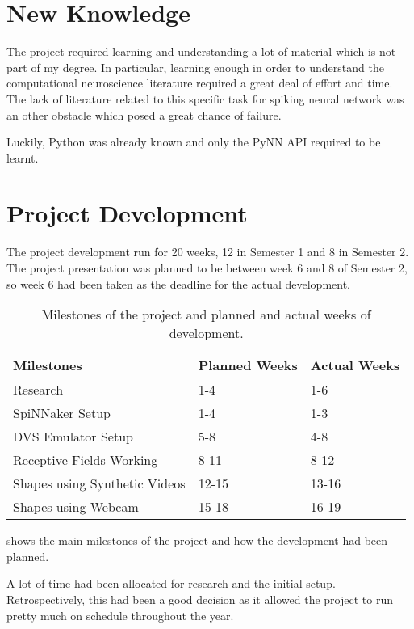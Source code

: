 \section{New Knowledge}
The project required learning and understanding a lot of material which is not part of my degree. In particular, learning enough in order to understand the computational neuroscience literature required a great deal of effort and time. The lack of literature related to this specific task for spiking neural network was an other obstacle which posed a great chance of failure. 

Luckily, Python was already known and only the PyNN API required to be learnt. 

\section{Project Development}
The project development run for 20 weeks, 12 in Semester 1 and 8 in Semester 2. The project presentation was planned to be between week 6 and 8 of Semester 2, so week 6 had been taken as the deadline for the actual development.  

\begin{table}[]
\centering
\begin{tabular}{l|ll}
Milestones                    & Planned Weeks & Actual Weeks \\ \hline
Research                      & 1-4           & 1-6          \\
SpiNNaker Setup               & 1-4           & 1-3          \\
DVS Emulator Setup            & 5-8           & 4-8          \\
Receptive Fields Working      & 8-11          & 8-12         \\
Shapes using Synthetic Videos & 12-15         & 13-16        \\
Shapes using Webcam           & 15-18         & 16-19       
\end{tabular}
\caption{Milestones of the project and planned and actual weeks of development.}
\label{table:development}
\end{table}

 shows the main milestones of the project and how the development had been planned. 

A lot of time had been allocated for research and the initial setup. Retrospectively, this had been a good decision as it allowed the project to run pretty much on schedule throughout the year.

